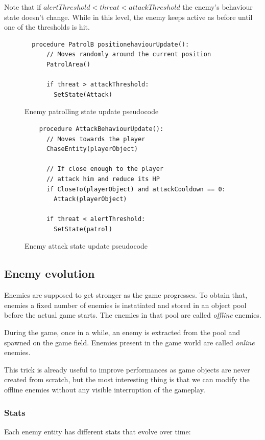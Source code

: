 \documentclass[11pt]{article}
\begin{document}
Note that if $alertThreshold < threat < attackThreshold$ the enemy's behaviour state doesn't change. While in this level, the enemy keeps active as before until one of the thresholds is hit.

\FloatBarrier

\begin{figure}
  \begin{lstlisting}
  procedure PatrolB positionehaviourUpdate():
      // Moves randomly around the current position
      PatrolArea() 

      if threat > attackThreshold:
        SetState(Attack)
  \end{lstlisting}
  \caption{Enemy patrolling state update pseudocode}
\end{figure}

\begin{figure}
  \begin{lstlisting}
    procedure AttackBehaviourUpdate():
      // Moves towards the player
      ChaseEntity(playerObject) 

      // If close enough to the player
      // attack him and reduce its HP
      if CloseTo(playerObject) and attackCooldown == 0: 
        Attack(playerObject)

      if threat < alertThreshold: 
        SetState(patrol)
  \end{lstlisting}
  \caption{Enemy attack state update pseudocode}
\end{figure}

\FloatBarrier

\subsection{Enemy evolution}
Enemies are supposed to get stronger as the game progresses.
To obtain that, enemies a fixed number of enemies is instatiated and stored in an object pool before the actual game starts. The enemies in that pool are called \textit{offline} enemies.

During the game, once in a while, an enemy is extracted from the pool and spawned on the game field. Enemies present in the game world are called \textit{online} enemies.

This trick is already useful to improve performances as game objects are never created from scratch, but the most interesting thing is that we can modify the offline enemies without any visible interruption of the gameplay.

\subsubsection{Stats}
Each enemy entity has different stats that evolve over time:
\end{document}
